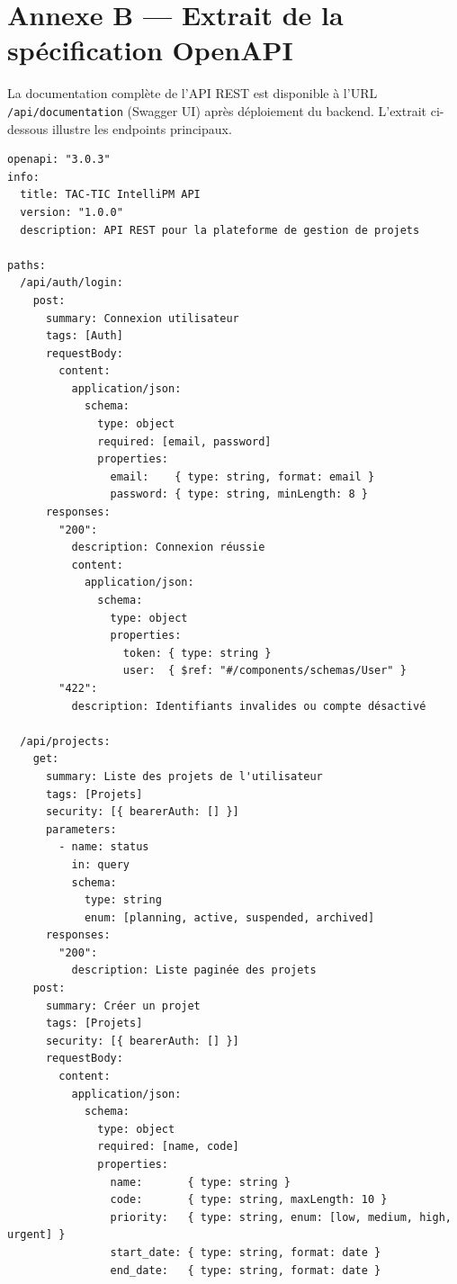 \chapter{Annexe B — Extrait de la spécification OpenAPI}

La documentation complète de l'API REST est disponible à l'URL
\texttt{/api/documentation} (Swagger UI) après déploiement du backend.
L'extrait ci-dessous illustre les endpoints principaux.

\begin{lstlisting}[style=yamlstyle,caption={OpenAPI 3.0 — Endpoints d'authentification et de projets},label={lst:openapi}]
openapi: "3.0.3"
info:
  title: TAC-TIC IntelliPM API
  version: "1.0.0"
  description: API REST pour la plateforme de gestion de projets

paths:
  /api/auth/login:
    post:
      summary: Connexion utilisateur
      tags: [Auth]
      requestBody:
        content:
          application/json:
            schema:
              type: object
              required: [email, password]
              properties:
                email:    { type: string, format: email }
                password: { type: string, minLength: 8 }
      responses:
        "200":
          description: Connexion réussie
          content:
            application/json:
              schema:
                type: object
                properties:
                  token: { type: string }
                  user:  { $ref: "#/components/schemas/User" }
        "422":
          description: Identifiants invalides ou compte désactivé

  /api/projects:
    get:
      summary: Liste des projets de l'utilisateur
      tags: [Projets]
      security: [{ bearerAuth: [] }]
      parameters:
        - name: status
          in: query
          schema:
            type: string
            enum: [planning, active, suspended, archived]
      responses:
        "200":
          description: Liste paginée des projets
    post:
      summary: Créer un projet
      tags: [Projets]
      security: [{ bearerAuth: [] }]
      requestBody:
        content:
          application/json:
            schema:
              type: object
              required: [name, code]
              properties:
                name:       { type: string }
                code:       { type: string, maxLength: 10 }
                priority:   { type: string, enum: [low, medium, high, urgent] }
                start_date: { type: string, format: date }
                end_date:   { type: string, format: date }


\end{lstlisting}
